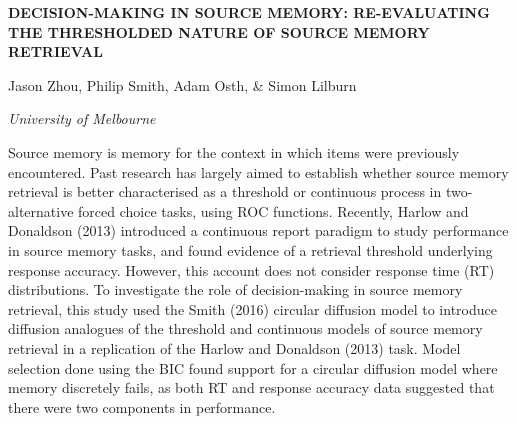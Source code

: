 \documentclass[]{article}
\begin{document}
\textbf{DECISION-MAKING IN SOURCE MEMORY: RE-EVALUATING THE THRESHOLDED
NATURE OF SOURCE MEMORY RETRIEVAL}

Jason Zhou, Philip Smith, Adam Osth, \& Simon Lilburn

\emph{University of Melbourne}

Source memory is memory for the context in which items were previously
encountered. Past research has largely aimed to establish whether source
memory retrieval is better characterised as a threshold or continuous
process in two-alternative forced choice tasks, using ROC functions.
Recently, Harlow and Donaldson (2013) introduced a continuous report
paradigm to study performance in source memory tasks, and found evidence
of a retrieval threshold underlying response accuracy. However, this
account does not consider response time (RT) distributions. To
investigate the role of decision-making in source memory retrieval, this
study used the Smith (2016) circular diffusion model to introduce
diffusion analogues of the threshold and continuous models of source
memory retrieval in a replication of the Harlow and Donaldson (2013)
task. Model selection done using the BIC found support for a circular
diffusion model where memory discretely fails, as both RT and response
accuracy data suggested that there were two components in performance.
\end{document}
